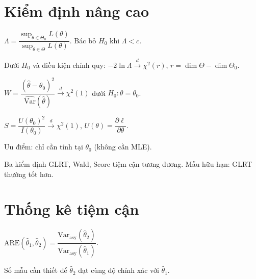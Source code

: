 \documentclass[12pt,a4paper]{article}
\begin{document}
\section{Kiểm định nâng cao}

\begin{dinhly}[title={Kiểm định tỉ số hợp lý tổng quát (GLRT)}]
  $\Lambda = \dfrac{\sup_{\theta \in \Theta_0} L(\theta)}{\sup_{\theta \in \Theta} L(\theta)}$. Bác bỏ $H_0$ khi $\Lambda < c$.

  Dưới $H_0$ và điều kiện chính quy: $-2\ln\Lambda \xrightarrow{d} \chi^2(r)$, $r = \dim\Theta - \dim\Theta_0$.
\end{dinhly}

\begin{dinhly}[title={Kiểm định Wald}]
  $W = \dfrac{(\hat{\theta} - \theta_0)^2}{\widehat{\text{Var}}(\hat{\theta})} \xrightarrow{d} \chi^2(1)$ dưới $H_0: \theta = \theta_0$.
\end{dinhly}

\begin{dinhly}[title={Kiểm định Score (Rao)}]
  $S = \dfrac{U(\theta_0)^2}{I(\theta_0)} \xrightarrow{d} \chi^2(1)$, \;$U(\theta) = \dfrac{\partial \ell}{\partial \theta}$.

  Ưu điểm: chỉ cần tính tại $\theta_0$ (không cần MLE).
\end{dinhly}

\begin{luuy}
  Ba kiểm định GLRT, Wald, Score tiệm cận tương đương. Mẫu hữu hạn: GLRT thường tốt hơn.
\end{luuy}

\section{Thống kê tiệm cận}

\begin{dinhnghia}[title={Hiệu quả tương đối tiệm cận (ARE)}]
  $\text{ARE}(\hat{\theta}_1, \hat{\theta}_2) = \dfrac{\text{Var}_{\text{asy}}(\hat{\theta}_2)}{\text{Var}_{\text{asy}}(\hat{\theta}_1)}$.

  Số mẫu cần thiết để $\hat{\theta}_2$ đạt cùng độ chính xác với $\hat{\theta}_1$.
\end{dinhnghia}
\end{document}
